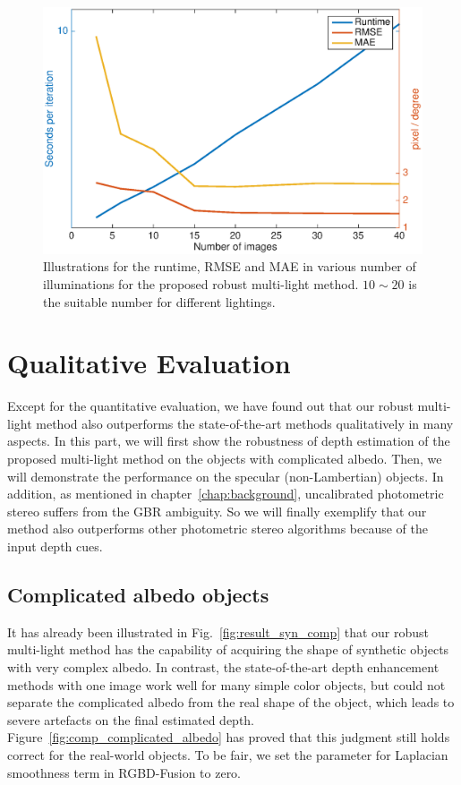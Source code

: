 \begin{figure}[!ht]
    \centering
    \includegraphics[height = 0.6\linewidth]{figures/result/runtime.eps} 
    \caption{Illustrations for the runtime, RMSE and MAE in various number of illuminations for the proposed robust multi-light method. $10\sim20$ is the suitable number for different lightings.}
\label{fig:result_runtime}
\end{figure}


\section{Qualitative Evaluation}
Except for the quantitative evaluation, we have found out that our robust multi-light method also outperforms the state-of-the-art methods qualitatively in many aspects.
In this part, we will first show the robustness of depth estimation of the proposed multi-light method on the objects with complicated albedo.
Then, we will demonstrate the performance on the specular (non-Lambertian) objects.
In addition, as mentioned in chapter~\ref{chap:background}, uncalibrated photometric stereo suffers from the GBR ambiguity.
So we will finally exemplify that our method also outperforms other photometric stereo algorithms because of the input depth cues.

\subsection{Complicated albedo objects}
It has already been illustrated in Fig.~\ref{fig:result_syn_comp} that our robust multi-light method has the capability of acquiring the shape of synthetic objects with very complex albedo.
In contrast, the state-of-the-art depth enhancement methods with one image work well for many simple color objects, but could not separate the complicated albedo from the real shape of the object, which leads to severe artefacts on the final estimated depth. 
Figure~\ref{fig:comp_complicated_albedo} has proved that this judgment still holds correct for the real-world objects.
To be fair, we set the parameter for Laplacian smoothness term in RGBD-Fusion to zero.

